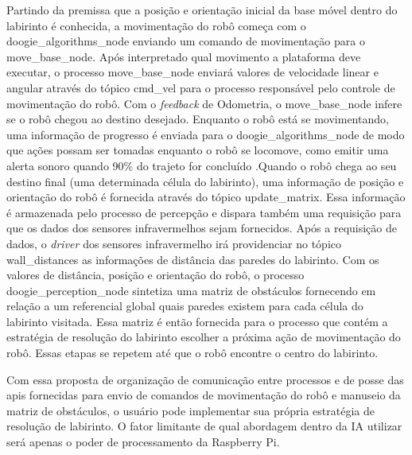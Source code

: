 Partindo da premissa que a posição e orientação inicial da base móvel dentro do labirinto é conhecida, a movimentação do robô começa com o doogie\_algorithms\_node enviando um comando de movimentação para o move\_base\_node. Após interpretado qual movimento a plataforma deve executar, o processo move\_base\_node enviará valores de velocidade linear e angular através do tópico cmd\_vel para o processo responsável pelo controle de movimentação do robô. Com o \textit{feedback} de Odometria, o move\_base\_node infere se o robô chegou ao destino desejado. Enquanto o robô está se movimentando, uma informação de progresso é enviada para o doogie\_algorithms\_node de modo que ações possam ser tomadas enquanto o robô se locomove, como emitir uma alerta sonoro quando 90\% do trajeto for concluído																																																																																																																																																																																																																																																																																					.Quando o robô chega ao seu destino final (uma determinada célula do labirinto), uma informação de posição e orientação do robô é fornecida através do tópico update\_matrix. Essa informação é armazenada pelo processo de percepção e dispara também uma requisição para que os dados dos sensores infravermelhos sejam fornecidos. Após a requisição de dados, o \textit{driver} dos sensores infravermelho irá providenciar no tópico wall\_distances as informações de distância das paredes do labirinto. Com os valores de distância, posição e orientação do robô, o processo doogie\_perception\_node sintetiza uma matriz de obstáculos fornecendo em relação a um referencial global quais paredes existem para cada célula do labirinto visitada. Essa matriz é então fornecida para o processo que contém a estratégia de resolução do labirinto escolher a próxima ação de movimentação do robô. Essas etapas se repetem até que o robô encontre o centro do labirinto.

Com essa proposta de organização de comunicação entre processos e de posse das \glspl*{api} fornecidas para envio de comandos de movimentação do robô e manuseio da matriz de obstáculos, o usuário pode implementar sua própria estratégia de resolução de labirinto. O fator limitante de qual abordagem dentro da IA utilizar será apenas o poder de processamento da Raspberry Pi.